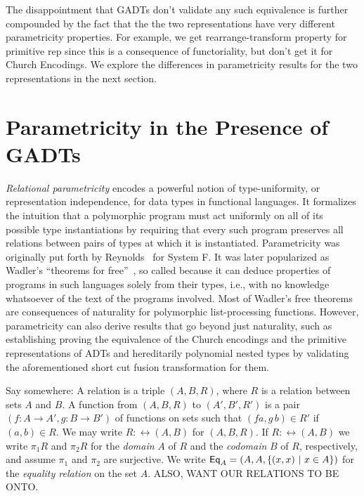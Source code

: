 \documentclass[acmsmall,screen,review,anonymous]{acmart}
\theoremstyle{definition}
\begin{document}
The disappointment that GADTs don't validate any such equivalence is
further compounded by the fact that the the two representations have
very different parametricity properties.  {\color{blue} For example,
  we get rearrange-transform property for primitive rep since this is
  a consequence of functoriality, but don't get it for Church
  Encodings.} We explore the differences in parametricity results for
the two representations in the next section.

\section{Parametricity in the Presence of GADTs}\label{sec:par}

{\em Relational parametricity} encodes a powerful notion of
type-uniformity, or representation independence, for data types in
functional languages. It formalizes the intuition that a polymorphic
program must act uniformly on all of its possible type instantiations
by requiring that every such program preserves all relations between
pairs of types at which it is instantiated. Parametricity was
originally put forth by Reynolds~\cite{rey83} for System F. It was
later popularized as Wadler's ``theorems for free''~\cite{wad89}, so
called because it can deduce properties of programs in such languages
solely from their types, i.e., with no knowledge whatsoever of the
text of the programs involved.  Most of Wadler's free theorems are
consequences of naturality for polymorphic list-processing
functions. However, parametricity can also derive results that go
beyond just naturality, such as establishing {\color{blue} proving}
the equivalence of the Church encodings and the primitive
representations of ADTs and {\color{blue} hereditarily polynomial}
nested types by validating the aforementioned short cut fusion
transformation for them.

{\color{blue} Say somewhere: A relation is a triple $(A,B,R)$, where
  $R$ is a relation between sets $A$ and $B$.  A function from
  $(A,B,R)$ to $(A',B',R')$ is a pair $(f : A \to A',g : B \to B')$ of
  functions on sets such that $(f a,g\,b) \in R'$ if $(a,b) \in R$. We
  may write $R : \rel(A,B)$ for $(A,B,R)$.  If $R : \rel(A,B)$ we
  write $\pi_1 R$ and $\pi_2 R$ for the {\em domain} $A$ of $R$ and
  the {\em codomain} $B$ of $R$, respectively, and assume $\pi_1$ and
  $\pi_2$ are surjective. We write $\mathsf{Eq}_A = (A,A,\{(x,x)~|~ x \in
  A\})$ for the {\em equality relation} on the set $A$. ALSO, WANT OUR
RELATIONS TO BE ONTO.}
\end{document}
